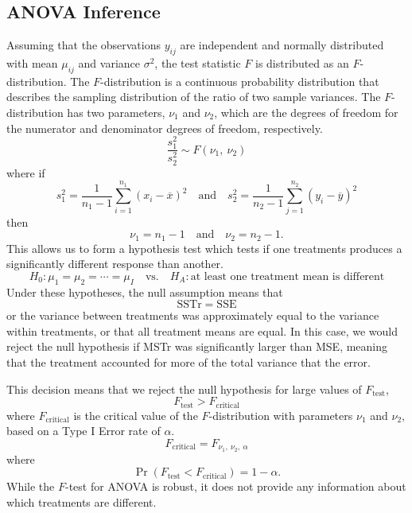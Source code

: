 \documentclass{article}
\begin{document}
\subsection{ANOVA Inference}
Assuming that the observations \(y_{ij}\) are independent and normally distributed with mean \(\mu_{ij}\) and variance \(\sigma^2\),
the test statistic \(F\) is distributed as an \(F\)-distribution. The \(F\)-distribution is a continuous probability distribution that describes
the sampling distribution of the ratio of two sample variances. The \(F\)-distribution has two parameters, \(\nu_1\) and \(\nu_2\), which are the
degrees of freedom for the numerator and denominator degrees of freedom, respectively.
\begin{equation*}
    \frac{s_1^2}{s_2^2} \sim F\left( \nu_1,\: \nu_2 \right)
\end{equation*}
where if
\begin{equation*}
    s_1^2 = \frac{1}{n_1 - 1} \sum_{i = 1}^{n_1} \left( x_i - \overline{x} \right)^2 \quad \text{and} \quad s_2^2 = \frac{1}{n_2 - 1} \sum_{j = 1}^{n_2} \left( y_i - \overline{y} \right)^2
\end{equation*}
then
\begin{equation*}
    \nu_1 = n_1 - 1 \quad \text{and} \quad \nu_2 = n_2 - 1.
\end{equation*}
This allows us to form a hypothesis test which tests if one treatments produces a significantly different response than another.
\begin{equation*}
    H_0: \mu_1 = \mu_2 = \cdots = \mu_I \quad \text{vs.} \quad H_A: \text{at least one treatment mean is different}
\end{equation*}
Under these hypotheses, the null assumption means that
\begin{equation*}
    \mathrm{SSTr} = \mathrm{SSE}
\end{equation*}
or the variance between treatments was approximately equal to the variance within treatments, or that
all treatment means are equal. In this case, we would reject the null hypothesis if MSTr was significantly larger than MSE,
meaning that the treatment accounted for more of the total variance that the error.

This decision means that we reject the null hypothesis for large values of \(F_{\mathrm{test}}\),
\begin{equation*}
    F_{\mathrm{test}} > F_\mathrm{critical}
\end{equation*}
where \(F_\mathrm{critical}\) is the critical value of the \(F\)-distribution with parameters \(\nu_1\) and \(\nu_2\), based
on a Type I Error rate of \(\alpha\).
\begin{equation*}
    F_\mathrm{critical} = F_{\nu_1,\: \nu_2,\: \alpha}
\end{equation*}
where
\begin{equation*}
    \Pr{\left( F_{\mathrm{test}} < F_\mathrm{critical} \right)} = 1 - \alpha.
\end{equation*}
While the \(F\)-test for ANOVA is robust, it does not provide any information about which treatments are different.
\end{document}
